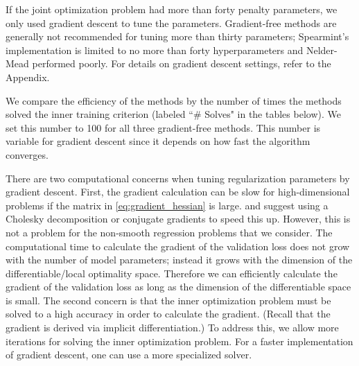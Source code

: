 \documentclass[12pt]{article}
\begin{document}
If the joint optimization problem had more than forty penalty parameters, we only used gradient descent to tune the parameters. Gradient-free methods are generally not recommended for tuning more than thirty parameters; Spearmint's implementation is limited to no more than forty hyperparameters and Nelder-Mead performed poorly. For details on gradient descent settings, refer to the Appendix.

We compare the efficiency of the methods by the number of times the methods solved the inner training criterion (labeled ``\# Solves" in the tables below). We set this number to 100 for all three gradient-free methods. This number is variable for gradient descent since it depends on how fast the algorithm converges.

There are two computational concerns when tuning regularization parameters by gradient descent. First, the gradient calculation can be slow for high-dimensional problems if the matrix in \eqref{eq:gradient_hessian} is large. \citet{bengio2000gradient} and \citet{foo2008efficient} suggest using a Cholesky decomposition or conjugate gradients to speed this up. However, this is not a problem for the non-smooth regression problems that we consider. The computational time to calculate the gradient of the validation loss does not grow with the number of model parameters; instead it grows with the dimension of the differentiable/local optimality space. Therefore we can efficiently calculate the gradient of the validation loss as long as the dimension of the differentiable space is small. The second concern is that the inner optimization problem must be solved to a high accuracy in order to calculate the gradient. (Recall that the gradient is derived via implicit differentiation.) To address this, we allow more iterations for solving the inner optimization problem. For a faster implementation of gradient descent, one can use a more specialized solver.
\end{document}
